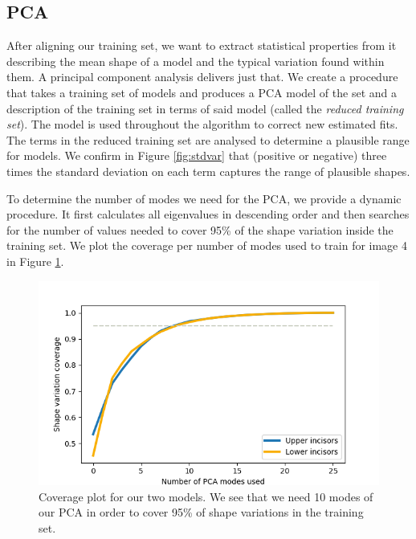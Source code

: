 \documentclass[a4paper,titlepage,12pt]{article}
\begin{document}
\subsection{PCA}
After aligning our training set, we want to extract statistical properties from it describing the mean shape of a model and the typical variation found within them. A principal component analysis delivers just that. We create a procedure that takes a training set of models and produces a PCA model of the set and a description of the training set in terms of said model (called the \emph{reduced training set}). The model is used throughout the algorithm to correct new estimated fits. The terms in the reduced training set are analysed to determine a plausible range for models. We confirm in Figure \ref{fig:stdvar} that (positive or negative) three times the standard deviation on each term captures the range of plausible shapes. 

To determine the number of modes we need for the PCA, we provide a dynamic procedure. It first calculates all eigenvalues in descending order and then searches for the number of values needed to cover 95\% of the shape variation inside the training set. We plot the coverage per number of modes used to train for image 4 in Figure \ref{fig:coverage}. 

\begin{figure}
	\centering
	\includegraphics[width=0.75\linewidth]{shape/coverage5}
	\caption{Coverage plot for our two models. We see that we need 10 modes of our PCA in order to cover 95\% of shape variations in the training set. }
	\label{fig:coverage}
\end{figure}
\end{document}
